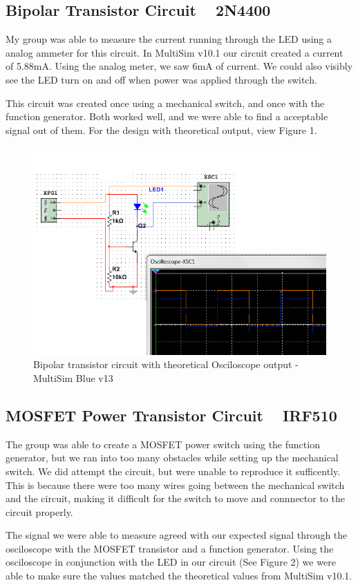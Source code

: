 \documentclass[a4paper]{article}
\begin{document}
\subsection{Bipolar Transistor Circuit ~ 2N4400}

My group was able to measure the current running through the LED using a analog ammeter for this circuit.  In MultiSim v10.1 our circuit created a current of 5.88mA.  Using the analog meter, we saw 6mA of current.  We could also visibly see the LED turn on and off when power was applied through the switch.  

This circuit was created once using a mechanical switch, and once with the function generator.  Both worked well, and we were able to find a acceptable signal out of them.  For the design with theoretical output, view Figure 1.

\begin{figure}
\centering
\includegraphics[width=.5\textwidth]{Circuit_one.png}
\caption{\label{fig:Circuit_one}Bipolar transistor circuit with theoretical Osciloscope output - MultiSim Blue v13}
\end{figure}

\subsection{MOSFET Power Transistor Circuit ~ IRF510}

The group was able to create a MOSFET power switch using the function generator, but we ran into too many obstacles while setting up the mechanical switch.  We did attempt the circuit, but were unable to reproduce it sufficently.  This is because there were too many wires going between the mechanical switch and the circuit, making it difficult for the switch to move and connnector to the circuit properly.

The signal we were able to measure agreed with our expected signal through the osciloscope with the MOSFET transistor and a function generator.  Using the osciloscope in conjunction with the LED in our circuit (See Figure 2) we were able to make sure the values matched the theoretical values from MultiSim v10.1.
\end{document}
